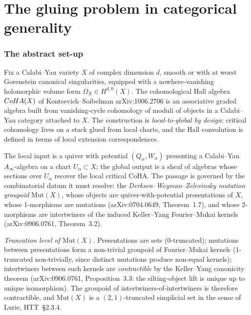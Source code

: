 \providecommand{\bC}{\mathbb C}
\providecommand{\bZ}{\mathbb Z}
\providecommand{\bN}{\mathbb N}
\providecommand{\bP}{\mathbb P}
\providecommand{\bQ}{\mathbb Q}
\providecommand{\bR}{\mathbb R}

\providecommand{\kch}{\kappa_{\mathrm{ch}}}
\providecommand{\kcat}{\kappa_{\mathrm{cat}}}
\providecommand{\kBKM}{\kappa_{\mathrm{BKM}}}
\providecommand{\kfib}{\kappa_{\mathrm{fiber}}}

\part{The gluing problem in categorical generality}
\label{ch:gluing-part-i}

\section{The abstract set-up}
\label{sec:glue-abstract-setup}

Fix a Calabi--Yau variety $X$ of complex dimension $d$, smooth or
with at worst Gorenstein canonical singularities, equipped with a
nowhere-vanishing holomorphic volume form $\Omega_X \in
H^{d,0}(X)$. The cohomological Hall algebra $CoHA(X)$ of
Kontsevich--Soibelman arXiv:1006.2706 is an associative graded
algebra built from vanishing-cycle cohomology of moduli of objects
in a Calabi--Yau category attached to $X$. The construction is
\emph{local-to-global by design}: critical cohomology lives on a
stack glued from local charts, and the Hall convolution is defined
in terms of local extension correspondences.

The local input is a quiver with potential $(Q_\alpha, W_\alpha)$
presenting a Calabi--Yau $A_\infty$-algebra on a chart
$U_\alpha \subset X$; the global output is a sheaf of algebras whose
sections over $U_\alpha$ recover the local critical CoHA. The
passage is governed by the combinatorial datum it must resolve: the
\emph{Derksen--Weyman--Zelevinsky mutation groupoid}
$\mathrm{Mut}(X)$, whose objects are quiver-with-potential
presentations of $X$, whose 1-morphisms are mutations
(arXiv:0704.0649, Theorem~1.7), and whose 2-morphisms are
intertwiners of the induced Keller--Yang Fourier--Mukai kernels
(arXiv:0906.0761, Theorem~3.2).

\emph{Truncation level of $\mathrm{Mut}(X)$.} Presentations are
sets (0-truncated); mutations between presentations form a
non-trivial groupoid of Fourier--Mukai kernels (1-truncated
non-trivially, since distinct mutations produce non-equal kernels);
intertwiners between such kernels are \emph{contractible} by the
Keller--Yang canonicity theorem (arXiv:0906.0761, Proposition~3.3:
the silting-object lift is unique up to unique isomorphism). The
groupoid of intertwiners-of-intertwiners is therefore contractible,
and $\mathrm{Mut}(X)$ is a $(2,1)$-truncated simplicial set in the
sense of Lurie, HTT~\S2.3.4.

